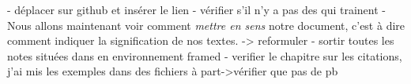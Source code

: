 - déplacer sur github et insérer le lien
- vérifier s'il n'y a pas des  qui trainent
- Nous allons maintenant voir comment \emph{mettre en sens} notre document, c'est à dire comment indiquer  la signification de nos textes. -> reformuler
- sortir toutes les notes situées dans en environnement framed
- verifier le chapitre sur les citations, j'ai mis les exemples dans des fichiers à part->vérifier que pas de pb